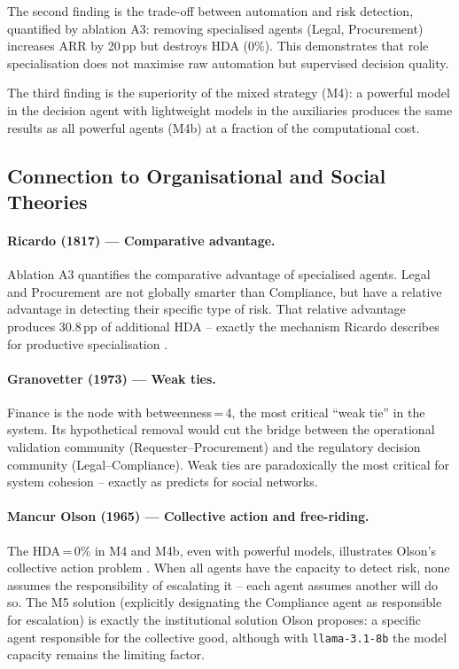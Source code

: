 \documentclass[preprint,12pt,authoryear]{elsarticle}
\begin{document}
The second finding is the trade-off between automation and risk detection,
quantified by ablation A3: removing specialised agents (Legal, Procurement)
increases ARR by 20\,pp but destroys HDA (0\%).
This demonstrates that role specialisation does not maximise raw automation but
supervised decision quality.

The third finding is the superiority of the mixed strategy (M4): a powerful
model in the decision agent with lightweight models in the auxiliaries produces
the same results as all powerful agents (M4b) at a fraction of the
computational cost.

\subsection{Connection to Organisational and Social Theories}

\paragraph{Ricardo (1817) --- Comparative advantage.}
Ablation A3 quantifies the comparative advantage of specialised agents.
Legal and Procurement are not globally smarter than Compliance, but have a
relative advantage in detecting their specific type of risk.
That relative advantage produces 30.8\,pp of additional HDA -- exactly the
mechanism Ricardo describes for productive specialisation \citep{ricardo1817}.

\paragraph{Granovetter (1973) --- Weak ties.}
Finance is the node with betweenness\,=\,4, the most critical ``weak tie'' in
the system.
Its hypothetical removal would cut the bridge between the operational validation
community (Requester--Procurement) and the regulatory decision community
(Legal--Compliance).
Weak ties are paradoxically the most critical for system cohesion -- exactly as
\citet{granovetter1973} predicts for social networks.

\paragraph{Mancur Olson (1965) --- Collective action and free-riding.}
The HDA\,=\,0\% in M4 and M4b, even with powerful models, illustrates Olson's
collective action problem \citep{olson1965}.
When all agents have the capacity to detect risk, none assumes the
responsibility of escalating it -- each agent assumes another will do so.
The M5 solution (explicitly designating the Compliance agent as responsible for
escalation) is exactly the institutional solution Olson proposes: a specific
agent responsible for the collective good, although with \texttt{llama-3.1-8b}
the model capacity remains the limiting factor.
\end{document}
